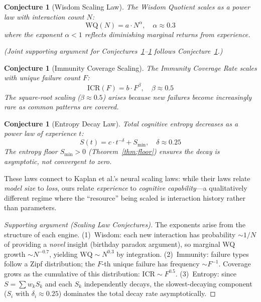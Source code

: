 \documentclass[11pt,a4paper]{article}
\newtheorem{conjecture}[theorem]{Conjecture}
\begin{document}
\begin{conjecture}[Wisdom Scaling Law]
\label{thm:wq_scaling}
The Wisdom Quotient scales as a power law with interaction count $N$:
\begin{equation}
  \text{WQ}(N) = a \cdot N^{\alpha}, \quad \alpha \approx 0.3
\end{equation}
where the exponent $\alpha < 1$ reflects diminishing marginal returns
from experience.
\end{conjecture}
\noindent\textit{(Joint supporting argument for Conjectures~\ref{thm:wq_scaling}--\ref{thm:entropy_decay} follows Conjecture~\ref{thm:entropy_decay}.)}

\begin{conjecture}[Immunity Coverage Scaling]
\label{thm:icr_scaling}
The Immunity Coverage Rate scales with unique failure count $F$:
\begin{equation}
  \text{ICR}(F) = b \cdot F^{\beta}, \quad \beta \approx 0.5
\end{equation}
The square-root scaling ($\beta \approx 0.5$) arises because new failures
become increasingly rare as common patterns are covered.
\end{conjecture}

\begin{conjecture}[Entropy Decay Law]
\label{thm:entropy_decay}
Total cognitive entropy decreases as a power law of experience $t$:
\begin{equation}
  S(t) = c \cdot t^{-\delta} + S_{\min}, \quad \delta \approx 0.25
\end{equation}
The entropy floor $S_{\min} > 0$ (Theorem~\ref{thm:floor}) ensures the
decay is asymptotic, not convergent to zero.
\end{conjecture}

These laws connect to Kaplan et al.'s neural scaling laws: while their
laws relate \emph{model size} to \emph{loss}, ours relate \emph{experience}
to \emph{cognitive capability}---a qualitatively different regime where
the ``resource'' being scaled is interaction history rather than parameters.

\begin{proof}[Supporting argument (Scaling Law Conjectures)]
The exponents arise from the structure of each engine.
(1)~Wisdom: each new interaction has probability $\sim 1/N$ of providing
a \emph{novel} insight (birthday paradox argument), so marginal WQ
growth $\sim N^{-0.7}$, yielding $\text{WQ} \sim N^{0.3}$ by integration.
(2)~Immunity: failure types follow a Zipf distribution; the $F$-th
unique failure has frequency $\sim F^{-1}$. Coverage grows as the
cumulative of this distribution: $\text{ICR} \sim F^{0.5}$.
(3)~Entropy: since $S = \sum w_k S_k$ and each $S_k$ independently
decays, the slowest-decaying component ($S_i$ with $\delta_i \approx 0.25$)
dominates the total decay rate asymptotically.
\end{proof}
\end{document}

